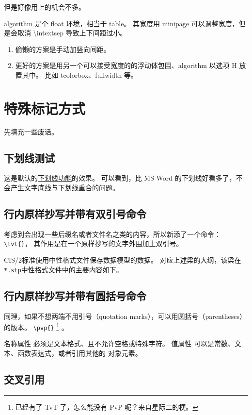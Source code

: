 \documentclass[../Main/thesis]{subfiles}
\begin{document}
但是好像用上的机会不多。

algorithm 是个 float 环境，相当于 table。
其宽度用 minipage 可以调整宽度，但是会取消 \textbackslash intextsep 导致上下间距过小。

\begin{enumerate}[(1)]
  \item 偷懒的方案是手动加竖向间距。
  \item 更好的方案是用另一个可以接受宽度的的浮动体包围、algorithm 以选项 H 放置其中。
  比如 tcolorbox、fullwidth 等。
\end{enumerate}

\section{特殊标记方式}
\label{sec:mark-methods}

先填充一些废话。\zhlipsum[9]

\subsection{下划线测试}
\label{ssc:underline}

这是默认的\underline{下划线功能}的效果。
可以看到，比 MS Word 的下划线好看多了，不会产生文字底线与下划线重合的问题。

\subsection{行内原样抄写并带有双引号命令}
\label{ssc:tvt}

考虑到会出现一些后缀名或者文件名之类的内容，所以新添了一个命令：
\verb|\tvt{}|，
其作用是在一个原样抄写的文字外围加上双引号。

CIS/2标准使用中性格式文件保存数据模型的数据。
对应上述梁的大纲，该梁在\texttt{*.stp}中性格式文件中的主要内容如下。

\subsection{行内原样抄写并带有圆括号命令}
\label{ssc:pvp}

同理，如果不想两端不用引号（quotation marks），可以用圆括号（parentheses）的版本。
\verb|\pvp{}|
\footnote{已经有了 TvT 了，怎么能没有 PvP 呢？来自星际二的梗。}
。

名称属性  必须是文本格式、且不允许空格或特殊字符。
值属性  可以是常数、文本、函数表达式，或者引用其他的 对象元素。

\subsection{交叉引用}
\label{ssc:cross-ref-cmd}
\end{document}
